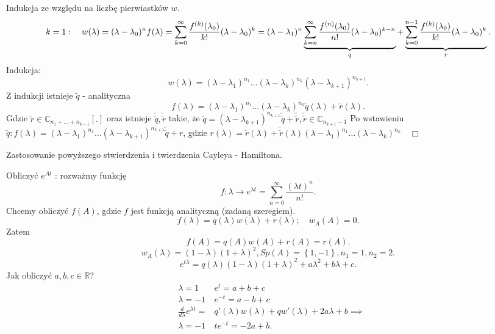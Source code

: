 \documentclass[../main.tex]{subfiles}
\begin{document}
    \begin{dowod}
        Indukcja ze względu na liczbę pierwiastków $w$.
        \[
            k=1:\quad w(\lambda) = (\lambda-\lambda_0)^n\\
            f(\lambda) = \sum_{k=0}^{\infty} \frac{f^{(k)}(\lambda_0)}{k!}(\lambda-\lambda_0)^k = (\lambda - \lambda_1)^n \underbrace{\sum_{k=n}^{\infty} \frac{f^{(n)}(\lambda_0)}{n!}(\lambda - \lambda_0)^{k-n}}_q + \underbrace{\sum_{k=0}^{n-1} \frac{f^{(k)}(\lambda_0)}{k!}(\lambda-\lambda_0)^k}_r
        .\]
        Indukcja:
        \[
            w(\lambda) = (\lambda - \lambda_1)^{n_1} \ldots (\lambda - \lambda_k)^{n_k} (\lambda-\lambda_{k+1})^{n_{k+1}}
        .\]
        Z indukcji istnieje $\tilde q$ - analityczna
        \[
            f(\lambda) = (\lambda-\lambda_1)^{n_1}\ldots(\lambda-\lambda_k)^{n_k}\tilde q(\lambda) + \tilde r(\lambda)
        .\] Gdzie $\tilde r\in \mathbb{C}_{n_1+\ldots+n_{k-1}}[.]$ oraz istnieje $\tilde \tilde q, \tilde \tilde r$ takie, że $\tilde q = (\lambda-\lambda_{k+1})^{n_{k+1}} \tilde \tilde q + \tilde \tilde r, \tilde \tilde r\in \mathbb{C}_{n_{k+1}-1}$
        Po wstawieniu $\tilde q: f(\lambda)=(\lambda-\lambda_1)^{n_1}\ldots(\lambda-\lambda_{k+1})^{n_{k+1}}\tilde \tilde q+r$, gdzie $r(\lambda) = \tilde r(\lambda) + \tilde \tilde r(\lambda) (\lambda-\lambda_1)^{n_1}\ldots(\lambda-\lambda_k)^{n_k}\quad\Box$
    \end{dowod}
    Zastosowanie powyższego stwierdzenia i twierdzenia Cayleya - Hamiltona.

    \begin{przyklad}
        Obliczyć $e^{A t}$ : rozważmy funkcję
        \[
            f: \lambda \to e^{\lambda t} = \sum_{n=0}^{\infty} \frac{(\lambda t)^n}{n!}
        .\]
        Chcemy obliczyć $f(A)$, gdzie $f$ jest funkcją analityczną (zadaną szeregiem).
        \[
            f(\lambda) = q(\lambda)w(\lambda) + r(\lambda); \quad w_A(A) = 0
        .\]
        Zatem
        \[
            f(A) = q(A)w(A)+ r(A) = r(A)
        .\]
        \[
            w_A(\lambda) = (1-\lambda)(1+\lambda)^2, Sp(A) = \left\{ 1,-1 \right\} ,n_1=1,n_2=2
        .\]
\[
    e^{t \lambda} = q(\lambda) (1-\lambda)(1+\lambda)^2 + a\lambda^2+b\lambda+c
.\]
Jak obliczyć $a,b,c\in\mathbb{R}$?
\begin{align*}
    &\lambda=1 &e^t = a+b+c\\
    &\lambda=-1 &e^{-t} = a-b+c\\
    &\frac{d}{d\lambda}e^{\lambda t} = &q'(\lambda)w(\lambda) + qw'(\lambda)+2a\lambda + b\implies\\
    &\lambda = -1 &te^{- t} = -2a+b
.\end{align*}
    \end{przyklad}
\end{document}
